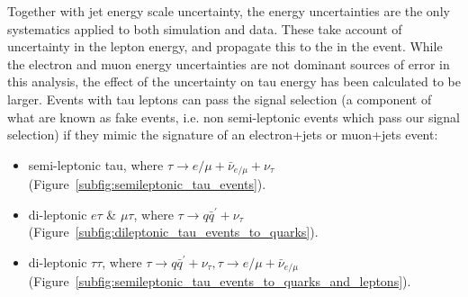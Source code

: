 Together with jet energy scale uncertainty, the \met energy uncertainties are the only systematics applied to
both simulation and data. These take account of uncertainty in the lepton energy, and propagate this to the
\met in the event. While the electron and muon energy uncertainties are not dominant sources of error in this
analysis, the effect of the uncertainty on tau energy has been calculated to be larger. Events with tau
leptons can pass the signal selection (a component of what are known as fake events, i.e. non semi-leptonic
\ttbar events which pass our signal selection) if they mimic the signature of an electron+jets or muon+jets
\ttbar event:

\begin{itemize}
 \item semi-leptonic tau, where $\tau \rightarrow e/\mu + \bar{\nu}_{e/\mu} + \nu_{\tau}$
 (Figure~\ref{subfig:semileptonic_tau_events}).
 \item di-leptonic $e\tau$ \& $\mu\tau$, where $\tau \rightarrow q\bar{q}^{'} + \nu_\tau$
 (Figure~\ref{subfig:dileptonic_tau_events_to_quarks}).
 \item di-leptonic $\tau\tau$, where $\tau \rightarrow q\bar{q}^{'} + \nu_\tau, \tau \rightarrow e/\mu
 + \bar{\nu}_{e/\mu}$ (Figure~\ref{subfig:semileptonic_tau_events_to_quarks_and_leptons}).
\end{itemize}

